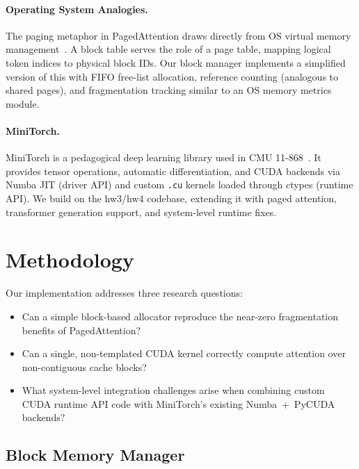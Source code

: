 \documentclass{article}
\begin{document}
\paragraph{Operating System Analogies.}
The paging metaphor in PagedAttention draws directly from OS virtual memory management~\cite{silberschatz2018os}.
A block table serves the role of a page table, mapping logical token indices to physical block IDs.
Our block manager implements a simplified version of this with FIFO free-list allocation, reference counting (analogous to shared pages), and fragmentation tracking similar to an OS memory metrics module.

\paragraph{MiniTorch.}
MiniTorch is a pedagogical deep learning library used in CMU 11-868~\cite{rush2020minitorch}. It provides tensor operations, automatic differentiation, and CUDA backends via Numba JIT (driver API) and custom \texttt{.cu} kernels loaded through ctypes (runtime API).
We build on the hw3/hw4 codebase, extending it with paged attention, transformer generation support, and system-level runtime fixes.

\section{Methodology}
\label{sec:method}

Our implementation addresses three research questions:
\begin{itemize}
    \item[\textbf{RQ1}] Can a simple block-based allocator reproduce the near-zero fragmentation benefits of PagedAttention?
    \item[\textbf{RQ2}] Can a single, non-templated CUDA kernel correctly compute attention over non-contiguous cache blocks?
    \item[\textbf{RQ3}] What system-level integration challenges arise when combining custom CUDA runtime API code with MiniTorch's existing Numba~+~PyCUDA backends?
\end{itemize}

\subsection{Block Memory Manager}
\label{sec:block_manager}
\end{document}
